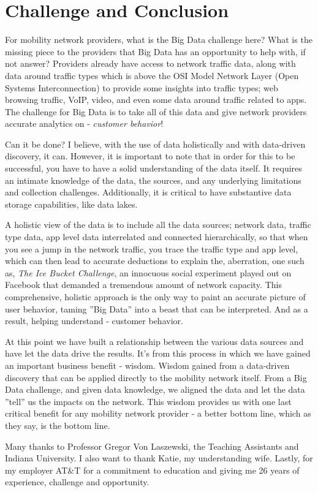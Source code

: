 \documentclass[sigconf]{acmart}
\begin{document}
\section{Challenge and Conclusion}

For mobility network providers, what is the Big Data challenge here?  What is the missing piece to the providers that Big Data has an opportunity to help with, if not answer?  Providers already have access to network traffic data, along with data around traffic types which is above the OSI Model Network Layer (Open Systems Interconnection) to provide some insights into traffic types; web browsing traffic, VoIP, video, and even some data around traffic related to apps.  The challenge for Big Data is to take all of this data and give network providers accurate analytics on - {\em customer behavior}!  

Can it be done?   I believe, with the use of data holistically and with data-driven discovery, it can. However, it is important to note that in order for this to be successful, you have to have a solid understanding of the data itself.  It requires an intimate knowledge of the data, the sources, and any underlying limitations and collection challenges.  Additionally, it is critical to have substantive data storage capabilities, like data lakes. 

A holistic view of the data is to include all the data sources; network data, traffic type data, app level data interrelated and connected hierarchically, so that when you see a jump in the network traffic, you trace the traffic type and app level, which can then lead to accurate deductions to explain the, aberration, one such as, {\em The Ice Bucket Challenge}, an innocuous social experiment played out on Facebook that demanded a tremendous amount of network capacity.  This comprehensive, holistic approach is the only way to paint an accurate picture of user behavior, taming ''Big Data'' into a beast that can be interpreted.  And as a result, helping understand - customer behavior.  

At this point we have built a relationship between the various data sources and have let the data drive the results.  It's from this process in which we have gained an important business benefit - wisdom.  Wisdom gained from a data-driven discovery that can be applied directly to the mobility network itself. From a Big Data challenge, and given data knowledge, we aligned the data and let the data ''tell'' us the impacts on the network.  This wisdom provides us with one last critical benefit for any mobility network provider - a better bottom line, which as they say, is the bottom line.

\begin{acks}

Many thanks to Professor Gregor Von Laszewski, the Teaching Assistants and Indiana University.  I also want to thank Katie, my understanding wife.  Lastly, for my employer AT\&T for a commitment to education and giving me 26 years of experience, challenge and opportunity.

\end{acks}




 
\end{document}
